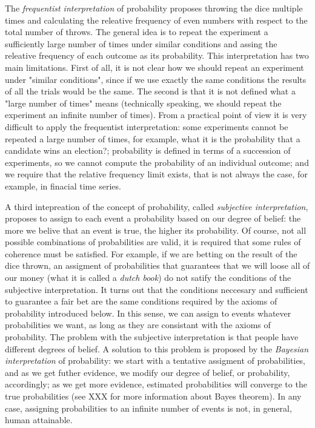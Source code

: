 The \emph{frequentist interpretation} of probability proposes throwing the dice multiple times and calculating the releative frequency of even numbers with respect to the total number of throws. The general idea is to repeat the experiment a sufficiently large number of times under similar conditions and assing the releative frequency of each outcome as its probability. This interpretation has two main limitations. First of all, it is not clear how we should repeat an experiment under "similar conditions", since if we use exactly the same conditions the results of all the trials would be the same. The second is that it is not defined what a "large number of times" means (technically speaking, we should repeat the experiment an infinite number of times). From a practical point of view it is very difficult to apply the frequentist interpretation: some experiments cannot be repeated a large number of times, for example, what it is the probability that a candidate wins an election?; probability is defined in terms of a succession of experiments, so we cannot compute the probability of an individual outcome; and we require that the relative frequency limit exists, that is not always the case, for example, in finacial time series.

A third intepreation of the concept of probability, called \emph{subjective interpretation}, proposes to assign to each event a probability based on our degree of belief: the more we belive that an event is true, the higher its probability. Of course, not all possible combinations of probabilities are valid, it is required that some rules of coherence must be satisfied. For example, if we are betting on the result of the dice thrown, an assigment of probabilities that guarantees that we will loose all of our money (what it is called a \emph{dutch book}) do not satify the conditions of the subjective interpretation. It turns out that the conditions neccesary and sufficient to guarantee a fair bet are the same conditions required by the axioms of probability introduced below. In this sense, we can assign to events whatever probabilities we want, as long as they are consistant with the axioms of probability. The problem with the subjective interpretation is that people have different degrees of belief. A solution to this problem is proposed by the \emph{Bayesian interpretation} of probability: we start with a tentative assigment of probabilities, and as we get futher evidence, we modify our degree of belief, or probability, accordingly; as we get more evidence, estimated probabilities will converge to the true probabilities (see {\color{red} XXX} for more information about Bayes theorem). In any case, assigning probabilities to an infinite number of events is not, in general, human attainable. 

